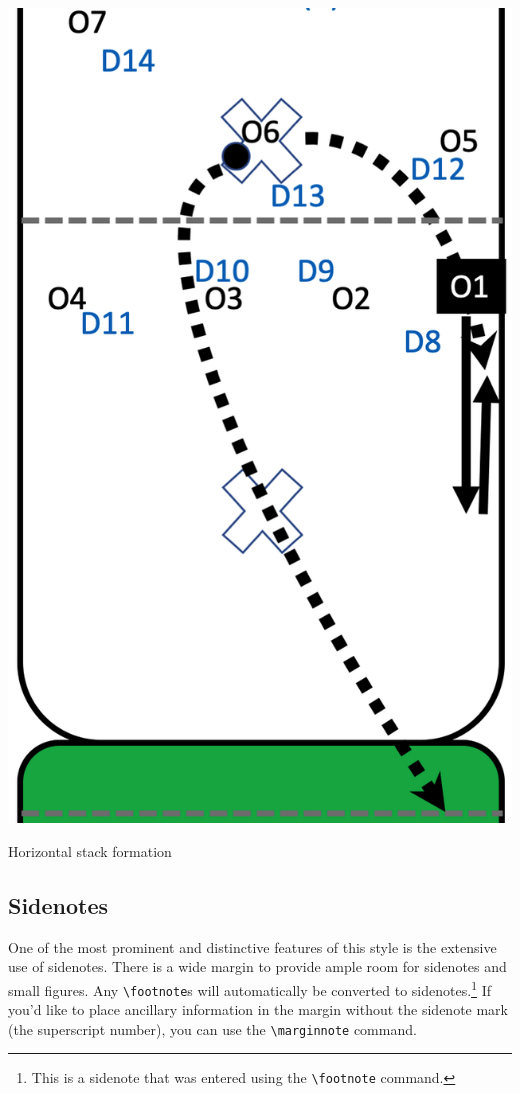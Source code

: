 \documentclass{tufte-handout}
\begin{document}
\begin{marginfigure}%
  \includegraphics[width=\linewidth]{O1-horizontal}
  \caption{Horizontal stack formation}
  \label{fig:O1-horizontal}
\end{marginfigure}



\subsection{Sidenotes}\label{sec:sidenotes}
One of the most prominent and distinctive features of this style is the
extensive use of sidenotes.  There is a wide margin to provide ample room
for sidenotes and small figures.  Any \Verb|\footnote|s will automatically
be converted to sidenotes.\footnote{This is a sidenote that was entered
using the \texttt{\textbackslash footnote} command.}  If you'd like to place ancillary
information in the margin without the sidenote mark (the superscript
number), you can use the \Verb|\marginnote| command.
\end{document}
